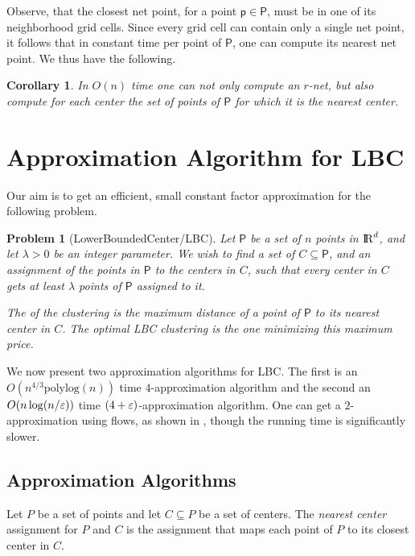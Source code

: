 \ifx\STACS\undefined \documentclass[12pt]{article}\else \documentclass[runningheads,a4paper]{llncs}
\newcommand{\LowerBoundedCenter}   {\PStyle{{Lower{}Bounded{}Center}}\xspace}
\newcommand{\lbc}{\PStyle{LBC}\xspace}
\newcommand{\emphi}[1]{\emphic{#1}{#1}}
\newcommand{\PStyle}[1]{\textcolor{red25}{\textrm{\textsf{#1}}}}
\newtheorem{corollary}[theorem]{Corollary}
\newtheorem{problem}[theorem]{Problem}}
\renewcommand{\Re}{{\rm I\!\hspace{-0.025em} R}}
\newcommand{\seclab}[1]{\label{sec:#1}}
\newcommand{\corlab}[1]{\label{cor:#1}}
\newcommand{\pnt}{{\mathsf{p}}}\newcommand{\pntA}{{\mathsf{q}}}\newcommand{\pntB}{{\mathsf{s}}}
\newcommand{\PntSet}{\mathsf{P}}\newcommand{\PntSetA}{\mathsf{W}}
\newcommand{\centers}{C}\newcommand{\lb}{\lambda}
\newcommand{\polylog}{\mathrm{polylog}}
\begin{document}
Observe, that the closest net point, for a point $\pnt \in \PntSet$,
must be in one of its neighborhood grid cells. Since every grid cell
can contain only a single net point, it follows that in constant time
per point of $\PntSet$, one can compute its nearest net point.  We
thus have the following.

\begin{corollary}\corlab{valid}In $O(n)$ time one can not only compute an $r$-net, but also
    compute for each center the set of points of $\PntSet$ for which 
    it is the nearest center.
\end{corollary}






\section{Approximation Algorithm for \lbc}
\seclab{lbc}


Our aim is to get an efficient, small constant factor approximation for
the following problem.

\begin{problem}[\LowerBoundedCenter/\lbc] Let $\PntSet$ be a set of
    $n$ points in $\Re^d$, and let $\lb>0$ be an integer parameter.
    We wish to find a set of \emphi{centers} $\centers\subseteq
    \PntSet$, and an assignment of the points in $\PntSet$ to the
    centers in $\centers$, such that every center in $\centers$ gets
    at least $\lb$ points of $\PntSet$ assigned to it.

    The \emphi{price} of the clustering is the maximum distance of a
    point of $\PntSet$ to its nearest center in $\centers$. The
    optimal \lbc clustering is the one minimizing this maximum price.
\end{problem}

We now present two approximation algorithms for \lbc.  
The first is an $O(n^{4/3}\polylog(n))$ time $4$-approximation algorithm 
and the second an $O(n \log( n/\varepsilon ))$ time $(4+\varepsilon)$-approximation algorithm.  
One can get a $2$-approximation using flows, as shown in 
\cite{apftkkz-aac-10}, though the running time is significantly slower.




\subsection{Approximation Algorithms}
Let $P$ be a set of points and let $C \subseteq P$ be a set of
centers. The \emph{nearest center} assignment for $P$ and $C$ is the
assignment that maps each point of $P$ to its closest center in $C$.
\end{document}
